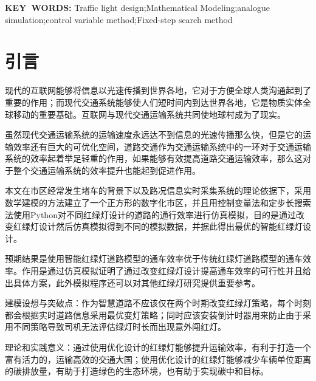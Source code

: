 \documentclass[a4paper,12pt]{article}
\numberwithin{equation}{section}
\providecommand{\keywords}[1]{\fontsize{14pt}{16.8pt}\selectfont\textbf{{KEY\ WORDS:}} #1}
\begin{document}
	\keywords{Traffic light design;Mathematical Modeling;analogue simulation;control variable method;Fixed-step search method}
	\newpage
	\tableofcontents
	
	\newpage
	\setcounter{page}{1}
	\section{引言}
	现代的互联网能够将信息以光速传播到世界各地，它对于方便全球人类沟通起到了重要的作用；而现代交通系统能够使人们短时间内到达世界各地，它是物质实体全球移动的重要基础。互联网与现代交通运输系统共同使地球村成为了现实。\par
	虽然现代交通运输系统的运输速度永远达不到信息的光速传播那么快，但是它的运输效率还有巨大的可优化空间，道路交通作为交通运输系统中的一环对于交通运输系统的效率起着举足轻重的作用，如果能够有效提高道路交通运输效率，那么这对于整个交通运输系统的效率提升也能起到促进作用。\par
	本文在市区经常发生堵车的背景下以及路况信息实时采集系统的理论依据下，采用数学建模的方法建立了一个正方形的数字化市区，并且用控制变量法和定步长搜索法使用Python对不同红绿灯设计的道路的通行效率进行仿真模拟，目的是通过改变红绿灯设计然后仿真模拟得到不同的模拟数据，并据此得出最优的智能红绿灯设计。\par
	预期结果是使用智能红绿灯道路模型的通车效率优于传统红绿灯道路模型的通车效率。作用是通过仿真模拟证明了通过改变红绿灯设计提高通车效率的可行性并且给出具体方案，此外模拟程序还可以对其他红绿灯研究提供重要参考。\par
	建模设想与突破点：作为智慧道路不应该仅在两个时期改变红绿灯策略，每个时刻都会根据实时道路信息采用最优变灯策略；同时应该安装倒计时器用来防止由于采用不同策略导致司机无法评估绿灯时长而出现意外闯红灯。\par
		
	理论和实践意义：通过使用优化设计的红绿灯能够提升运输效率，有利于打造一个富有活力的，运输高效的交通大国；使用优化设计的红绿灯能够减少车辆单位距离的碳排放量，有助于打造绿色的生态环境，也有助于实现碳中和目标。\par
	
\end{document}
